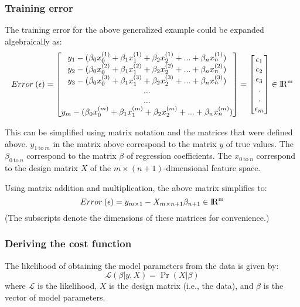 \documentclass{article}
\begin{document}
	\subsubsection{Training error}
	The training error for the above generalized example could be expanded algebraically as:
	\begin{equation*}
	Error\:(\epsilon)=\begin{bmatrix}
	y_1 - (\beta_0x^{(1)}_0+\beta_1x^{(1)}_1+\beta_2x^{(1)}_2+...+\beta_nx^{(1)}_n)\\
	y_2 - (\beta_0x^{(2)}_0+\beta_1x^{(2)}_1+\beta_2x^{(2)}_2+...+\beta_nx^{(2)}_n)\\
	y_3 - (\beta_0x^{(3)}_0+\beta_1x^{(3)}_1+\beta_2x^{(3)}_2+...+\beta_nx^{(3)}_n)\\
	...\\
	...\\
	y_m - (\beta_0x^{(m)}_0+\beta_1x^{(m)}_1+\beta_2x^{(m)}_2+...+\beta_nx^{(m)}_n)
	\end{bmatrix}=
	\begin{bmatrix}
	\epsilon_1\\
	\epsilon_2\\
	\epsilon_3\\
	.\\
	.\\
	\epsilon_m
	\end{bmatrix}\in\rm I\!R^{m}
	\end{equation*}
	
	This can be simplified using matrix notation and the matrices that were defined above. $y_{1\:\text{to}\:m}$ in the matrix above correspond to the matrix $y$ of true values. The $\beta_{0\:\text{to}\:n}$ correspond to the matrix $\beta$ of regression coefficients. The $x_{0\:\text{to}\:n}$ correspond to the design matrix $X$ of the $m\times(n+1)$-dimensional feature space.
	
	Using matrix addition and multiplication, the above matrix simplifies to:
	\begin{equation*}
	Error\:(\epsilon) =y_{m\times1}- X_{m\times n+1}\beta_{n+1}\in\rm I\!R^{m}
	\end{equation*}
	(The subscripts denote the dimensions of these matrices for convenience.)
	
	\subsubsection{Deriving the cost function}
	The likelihood of obtaining the model parameters from the data is given by:
	\begin{equation*}
	\mathcal{L}(\beta|y,X)=\Pr(X|\beta)
	\end{equation*}
	where $\mathcal{L}$ is the likelihood, $X$ is the design matrix (i.e., the data), and $\beta$ is the vector of model parameters.
	
\end{document}
